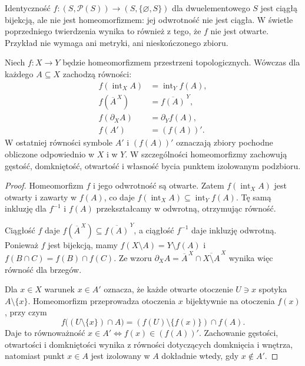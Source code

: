 \begin{przyklad}
\label{ex:topog-bijekcja-niehomeomorfizm}
Identyczność
$f\colon(S,\mathcal P(S))\to(S,\{\varnothing,S\})$
dla dwuelementowego $S$ jest ciągłą bijekcją,
ale nie jest homeomorfizmem: jej odwrotność nie jest
ciągła. W świetle poprzedniego twierdzenia wynika to
również z tego, że $f$ nie jest otwarte.
Przykład nie wymaga ani metryki, ani nieskończonego zbioru.
\end{przyklad}

\begin{stwierdzenie}
\label{prop:topog-homeomorfizm-operacje}
Niech $f\colon X\to Y$ będzie homeomorfizmem przestrzeni
topologicznych. Wówczas dla każdego $A\subseteq X$
zachodzą równości:
\begin{align*}
f(\operatorname{int}_X A)&=\operatorname{int}_Y f(A),\\
f(\overline A^{\,X})&=\overline{f(A)}^{\,Y},\\
f(\partial_X A)&=\partial_Y f(A),\\
f(A')&=(f(A))'.
\end{align*}
W ostatniej równości symbole $A'$ i $(f(A))'$ oznaczają
zbiory pochodne obliczone odpowiednio w $X$ i w $Y$.
W szczególności homeomorfizmy zachowują gęstość,
domkniętość, otwartość i własność bycia punktem izolowanym
podzbioru.
\end{stwierdzenie}
\begin{proof}
Homeomorfizm $f$ i jego odwrotność są otwarte.
Zatem $f(\operatorname{int}_X A)$ jest otwarty
i zawarty w $f(A)$, co daje
$f(\operatorname{int}_X A)\subseteq\operatorname{int}_Y f(A)$.
Tę samą inkluzję dla $f^{-1}$ i $f(A)$
przekształcamy w odwrotną, otrzymując równość.

Ciągłość $f$ daje
$f(\overline A^{\,X})\subseteq\overline{f(A)}^{\,Y}$,
a ciągłość $f^{-1}$ daje inkluzję odwrotną.
Ponieważ $f$ jest bijekcją, mamy
$f(X\setminus A)=Y\setminus f(A)$
i $f(B\cap C)=f(B)\cap f(C)$.
Ze wzoru
$\partial_X A=\overline A^{\,X}\cap
\overline{X\setminus A}^{\,X}$
wynika więc równość dla brzegów.

Dla $x\in X$ warunek $x\in A'$ oznacza,
że każde otwarte otoczenie $U\ni x$
spotyka $A\setminus\{x\}$.
Homeomorfizm przeprowadza otoczenia $x$
bijektywnie na otoczenia $f(x)$, przy czym
\[
f\bigl((U\setminus\{x\})\cap A\bigr)
=(f(U)\setminus\{f(x)\})\cap f(A).
\]
Daje to równoważność
$x\in A'\Longleftrightarrow f(x)\in(f(A))'$.
Zachowanie gęstości, otwartości i domkniętości
wynika z równości dotyczących domknięcia
i wnętrza, natomiast punkt $x\in A$
jest izolowany w $A$ dokładnie wtedy,
gdy $x\notin A'$.
\end{proof}

